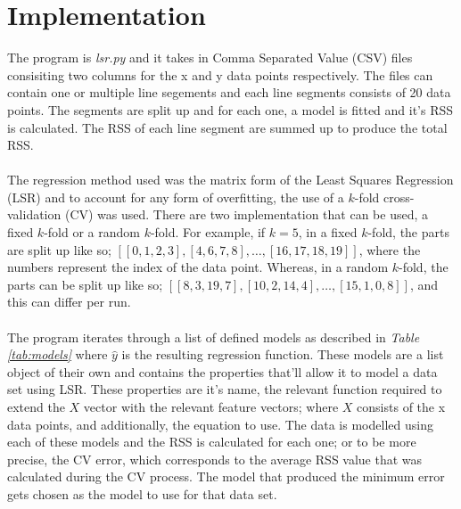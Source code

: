 \documentclass[a4paper,11pt]{article}
\begin{document}
\section{Implementation}
The program is \textit{lsr.py} and it takes in Comma Separated Value (CSV) files
consisiting two columns for the x and y data points respectively. The files can
contain one or multiple line segements and each line segments consists of 20
data points. The segments are split up and for each one, a model is fitted
and it's RSS is calculated. The RSS of each line segment are summed up to
produce the total RSS.
\\ \\
The regression method used was the matrix form of the Least Squares Regression (LSR)
and to account for any form of overfitting, the use of a $k$-fold cross-validation (CV)
was used. There are two implementation that can be used, a fixed $k$-fold
or a random $k$-fold. For example, if $k = 5$, in a fixed $k$-fold, the parts are split up
like so; $[[0, 1, 2, 3], [4, 6, 7, 8], \dots, [16, 17, 18, 19]]$, where the
numbers represent the index of the data point. Whereas, in a random $k$-fold, the parts
can be split up like so; $[[8, 3, 19, 7], [10, 2, 14, 4], \dots, [15, 1, 0, 8]]$,
and this can differ per run. 
\\ \\
The program iterates through a list of defined models as described in
\textit{Table \ref{tab:models}} where $\hat{y}$ is the resulting regression function. These
models are a list object of their own and contains the properties that'll allow it
to model a data set using LSR. These properties are it's name, the relevant function required
to extend the $X$ vector with the relevant feature vectors; where $X$ consists of the x
data points, and additionally, the equation to use. The data is modelled using
each of these models and the RSS is calculated for each one; or to be more precise,
the CV error, which corresponds to the average RSS value that was calculated
during the CV process.  The model that produced the minimum error gets chosen
as the model to use for that data set.
\end{document}
